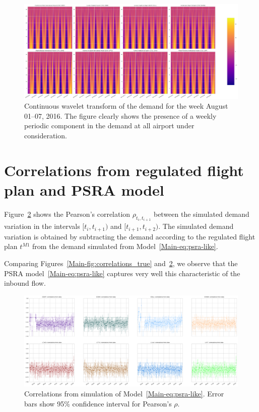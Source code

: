 \documentclass[]{elsarticle}
\begin{document}
\begin{figure}
  \includegraphics[width=\textwidth]{ContWavltTrasf}
  \caption{Continuous wavelet transform of the demand for the week August 01--07, 2016. The figure clearly shows the presence of a weekly periodic component in the demand at all airport under consideration.}\label{fig:cwt}
\end{figure}

\section{Correlations from regulated flight plan and \acs{PSRA} model}\label{sec:appb}

  Figure~\ref{fig:correlations_psra} shows the Pearson's correlation \(\rho_{t_i, t_{i+1}}\) between the simulated demand variation in the intervals \([t_i, t_{i+1})\) and \([t_{i+1}, t_{i+2})\). The simulated demand variation is obtained by subtracting the demand according to the regulated flight plan \(t^{M1}\) from the demand simulated from Model~\eqref{Main-eq:psra-like}.

  Comparing Figures~\ref{Main-fig:correlations_true} and~\ref{fig:correlations_psra}, we observe that the \ac{PSRA} model~\eqref{Main-eq:psra-like} captures very well this characteristic of the inbound flow.

  \begin{figure}
      \includegraphics[width=\textwidth]{correlations_psra}
      \caption{Correlations from simulation of Model~\eqref{Main-eq:psra-like}. Error bars show 95\% confidence interval for Pearson's \(\rho\).}
      \label{fig:correlations_psra}
  \end{figure}
\end{document}
